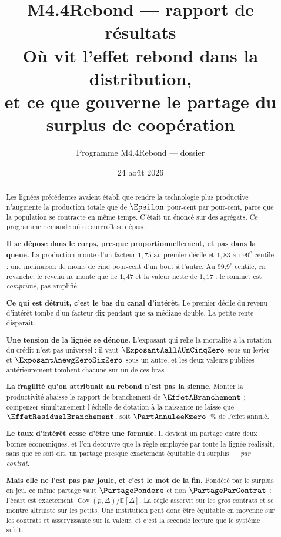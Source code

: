 \documentclass[11pt,a4paper]{article}
\title{M4.4Rebond --- rapport de résultats\\
\large Où vit l'effet rebond dans la distribution,\\
et ce que gouverne le partage du surplus de coopération}
\author{Programme M4.4Rebond --- dossier \code{m4\_4\_rebond\_credit\_soc}}
\date{24 août 2026}
\begin{document}
\maketitle

\begin{abstract}
Les lignées précédentes avaient établi que rendre la technologie plus
productive n'augmente la production totale que de $\Epsilon$ pour-cent par
pour-cent, parce que la population se contracte en même temps. C'était un
énoncé sur des agrégats. Ce programme demande où ce surcroît se dépose.

\textbf{Il se dépose dans le corps, presque proportionnellement, et pas dans
la queue.} La production monte d'un facteur $1{,}75$ au premier décile et
$1{,}83$ au 99\textsuperscript{e} centile : une inclinaison de moins de cinq
pour-cent d'un bout à l'autre. Au 99,9\textsuperscript{e} centile, en
revanche, le revenu ne monte que de $1{,}47$ et la valeur nette de $1{,}17$ :
le sommet est \emph{comprimé}, pas amplifié.

\textbf{Ce qui est détruit, c'est le bas du canal d'intérêt.} Le premier
décile du revenu d'intérêt tombe d'un facteur dix pendant que sa médiane
double. La petite rente disparaît.

\textbf{Une tension de la lignée se dénoue.} L'exposant qui relie la
mortalité à la rotation du crédit n'est pas universel : il vaut
$\ExposantAallAUnCinqZero$ sous un levier et $\ExposantAnewgZeroSixZero$ sous
un autre, et les deux valeurs publiées antérieurement tombent chacune sur un
de ces bras.

\textbf{La fragilité qu'on attribuait au rebond n'est pas la sienne.} Monter
la productivité abaisse le rapport de branchement de
$\EffetABranchement$ ; compenser simultanément l'échelle de dotation à la
naissance ne laisse que $\EffetResiduelBranchement$, soit
$\PartAnnuleeKzero$~\% de l'effet annulé.

\textbf{Le taux d'intérêt cesse d'être une formule.} Il devient un partage
entre deux bornes économiques, et l'on découvre que la règle employée par
toute la lignée réalisait, sans que ce soit dit, un partage presque
exactement équitable du surplus --- \emph{par contrat}.

\textbf{Mais elle ne l'est pas par joule, et c'est le mot de la fin.} Pondéré
par le surplus en jeu, ce même partage vaut $\PartagePondere$ et non
$\PartageParContrat$ : l'écart est exactement
$\operatorname{Cov}(p,\Delta)/\mathbb{E}[\Delta]$. La règle asservit sur les
gros contrats et se montre altruiste sur les petits. Une institution peut
donc être équitable en moyenne sur les contrats et asservissante sur la
valeur, et c'est la seconde lecture que le système subit.
\end{abstract}
\end{document}
